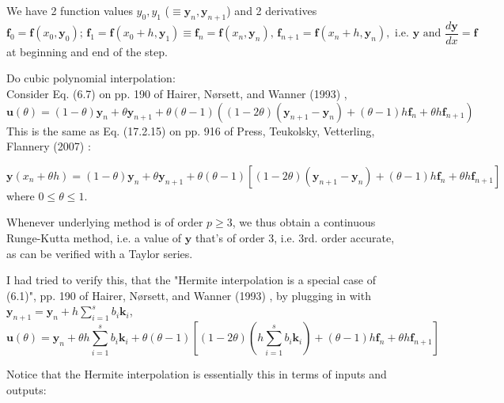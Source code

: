 \documentclass[10pt]{amsart}
\begin{document}
\begin{multicols*}{2}
We have 2 function values $y_0, y_1$ ($\equiv \mathbf{y}_n, \mathbf{y}_{n+1}$) and 2 derivatives 
\[
\mathbf{f}_0 = \mathbf{f}(x_0, \mathbf{y}_0); \, \mathbf{f}_1 = \mathbf{f}(x_0 + h, \mathbf{y}_1) \equiv \mathbf{f}_n = \mathbf{f}(x_n, \mathbf{y}_n) , \, \mathbf{f}_{n+1} = \mathbf{f}(x_n + h, \mathbf{y}_n), \text{ i.e. } \mathbf{y} \text{ and } \frac{d\mathbf{y}}{dx} = \mathbf{f}
\]
at beginning and end of the step.

Do cubic polynomial interpolation: \\
Consider Eq. (6.7) on pp. 190 of Hairer, N\o rsett, and Wanner (1993) \cite{HNW1993}, 
\begin{equation}\label{Eq:HermiteInterpolationHNWnotation}
	\mathbf{u}(\theta) = (1- \theta) \mathbf{y}_n + \theta \mathbf{y}_{n+1} + \theta(\theta - 1) ((1 - 2 \theta) (\mathbf{y}_{n+1} - \mathbf{y}_n) + (\theta - 1)h \mathbf{f}_n + \theta h \mathbf{f}_{n+1})
\end{equation}
This is the same as Eq. (17.2.15) on pp. 916 of Press, Teukolsky, Vetterling, Flannery (2007) \cite{PTVF2007}:

\begin{equation}
	\mathbf{y}(x_n + \theta h) = (1- \theta) \mathbf{y}_n + \theta \mathbf{y}_{n+1} + \theta ( \theta - 1) \left[ ( 1 - 2 \theta) ( \mathbf{y}_{n+1} - \mathbf{y}_n) + (\theta - 1) h \mathbf{f}_n + \theta h \mathbf{f}_{n+1} \right] 
\end{equation}
where $0\leq \theta \leq 1$.

Whenever underlying method is of order $p\geq 3$, we thus obtain a continuous Runge-Kutta method, i.e. a value of $\mathbf{y}$ that's of order 3, i.e. 3rd. order accurate, as can be verified with a Taylor series.

I had tried to verify this, that the "Hermite interpolation is a special case of (6.1)", pp. 190 of Hairer, N\o rsett, and Wanner (1993) \cite{HNW1993}, by plugging in with $\mathbf{y}_{n+1} = \mathbf{y}_n +h\sum_{i=1}^s b_i \mathbf{k}_i$, 
\[
\mathbf{u}(\theta) = \mathbf{y}_n + \theta h \sum_{i=1}^s b_i \mathbf{k}_i + \theta ( \theta - 1) \left[ (1 - 2\theta) (h \sum_{i=1}^s b_i \mathbf{k}_i) + (\theta - 1) h \mathbf{f}_n + \theta h \mathbf{f}_{n+1} \right]
\]

Notice that the Hermite interpolation is essentially this in terms of inputs and outputs:


\end{multicols*}
\end{document}

